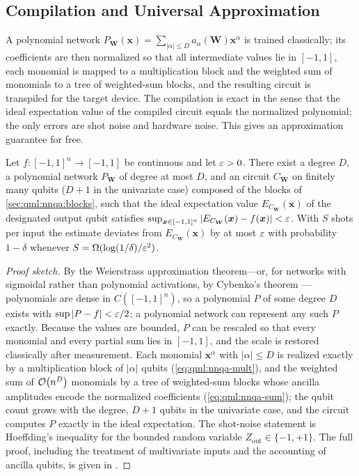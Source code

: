 \subsection{Compilation and Universal Approximation}\label{sec:qml:nnqa:theorem}

A polynomial network $P_{\bm{W}}(\bm{x}) = \sum_{|\alpha| \le D} a_\alpha(\bm{W}) \bm{x}^\alpha$ is trained classically; its coefficients are then normalized so that all intermediate values lie in $[-1,1]$, each monomial is mapped to a multiplication block and the weighted sum of monomials to a tree of weighted-sum blocks, and the resulting circuit is transpiled for the target device. The compilation is exact in the sense that the ideal expectation value of the compiled circuit equals the normalized polynomial; the only errors are shot noise and hardware noise. This gives an approximation guarantee for free.

\begin{theorem}\label{thm:qml:nnqa-ua}
Let $f \colon [-1,1]^n \to [-1,1]$ be continuous and let $\varepsilon > 0$. There exist a degree $D$, a polynomial network $P_{\bm{W}}$ of degree at most $D$, and an \nnqa{} circuit $C_{\bm{W}}$ on finitely many qubits ($D+1$ in the univariate case) composed of the blocks of \cref{sec:qml:nnqa:blocks}, such that the ideal expectation value $E_{C_{\bm{W}}}(\bm{x})$ of the designated output qubit satisfies $\sup_{\bm{x} \in [-1,1]^n} |E_{C_{\bm{W}}}(\bm{x}) - f(\bm{x})| < \varepsilon$. With $S$ shots per input the estimate deviates from $E_{C_{\bm{W}}}(\bm{x})$ by at most $\varepsilon$ with probability $1 - \delta$ whenever $S = \Omega(\log(1/\delta)/\varepsilon^2)$.
\end{theorem}

\begin{proof}[Proof sketch]
By the Weierstrass approximation theorem---or, for networks with sigmoidal rather than polynomial activations, by Cybenko's theorem \cite{cybenko1989approximation}---polynomials are dense in $C([-1,1]^n)$, so a polynomial $P$ of some degree $D$ exists with $\sup |P - f| < \varepsilon/2$; a polynomial network can represent any such $P$ exactly. Because the values are bounded, $P$ can be rescaled so that every monomial and every partial sum lies in $[-1,1]$, and the scale is restored classically after measurement. Each monomial $\bm{x}^\alpha$ with $|\alpha| \le D$ is realized exactly by a multiplication block of $|\alpha|$ qubits (\cref{eq:qml:nnqa-mult}), and the weighted sum of $\mathcal{O}\!\left(n^D\right)$ monomials by a tree of weighted-sum blocks whose ancilla amplitudes encode the normalized coefficients (\cref{eq:qml:nnqa-sum}); the qubit count grows with the degree, $D+1$ qubits in the univariate case, and the circuit computes $P$ exactly in the ideal expectation. The shot-noise statement is Hoeffding's inequality for the bounded random variable $Z_{\mathrm{out}} \in \{-1,+1\}$. The full proof, including the treatment of multivariate inputs and the accounting of ancilla qubits, is given in \cite{guo2026nnqa}.
\end{proof}

